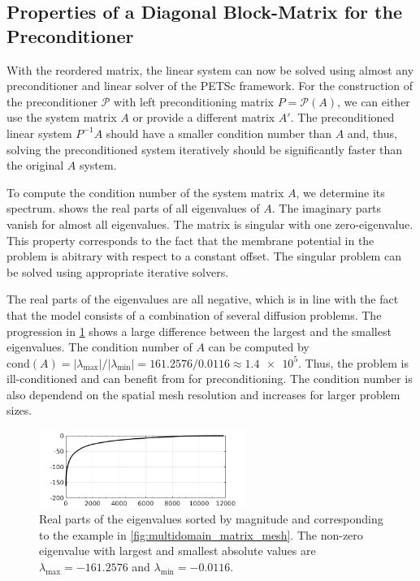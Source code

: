 \subsection{Properties of a Diagonal Block-Matrix for the Preconditioner}
With the reordered matrix, the linear system can now be solved using almost any preconditioner and linear solver of the PETSc framework. 
For the construction of the preconditioner $\mathcal{P}$ with left preconditioning matrix $P=\mathcal{P}(A)$, we can either use the system matrix $A$ or provide a different matrix $A'$. The preconditioned linear system $P^{-1}A$ should have a smaller condition number than $A$ and, thus, solving the preconditioned system iteratively should be significantly faster than the original $A$ system.

To compute the condition number of the system matrix $A$, we determine its spectrum.  shows the real parts of all eigenvalues of $A$. The imaginary parts vanish for almost all eigenvalues. The matrix is singular with one zero-eigenvalue. This property corresponds to the fact that the membrane potential in the problem is abitrary with respect to a constant offset. The singular problem can be solved using appropriate iterative solvers.

The real parts of the eigenvalues are all negative, which is in line with the fact that the model consists of a combination of several diffusion problems. The progression in \cref{fig:eigenvalues} shows a large difference between the largest and the smallest eigenvalues. The condition number of $A$ can be computed by $\textrm{cond}(A) = |\lambda_\text{max}| / |\lambda_\text{min}| = 161.2576 / 0.0116 \approx \num{1.4e5}$. Thus, the problem is ill-conditioned and can benefit from for preconditioning. The condition number is also dependend on the spatial mesh resolution and increases for larger problem sizes.

\begin{figure}
  \centering%
  \includegraphics[width=0.6\textwidth]{images/implementation/eigenvalues.png}%
  \caption{Real parts of the eigenvalues sorted by magnitude and corresponding to the example in \cref{fig:multidomain_matrix_mesh}. The non-zero eigenvalue with largest and smallest absolute values are $\lambda_\text{max} = \num{-161.2576}$ and $\lambda_\text{min} = \num{-0.0116}$.}%
  \label{fig:eigenvalues}%
\end{figure}%


